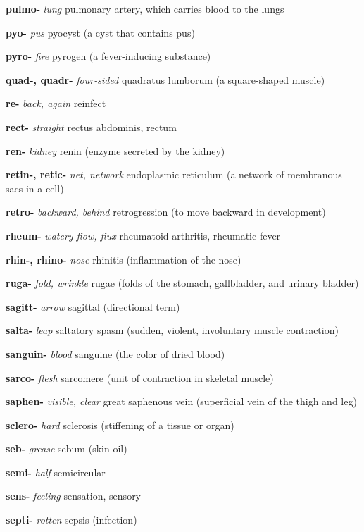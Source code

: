 \documentclass[10pt]{article}
\begin{document}
\begin{multicols}{2}
\begin{hangparas}{10pt}{1}
 \textbf{pulmo-} \textit{lung} pulmonary artery, which carries blood to the lungs \par
 \textbf{pyo-} \textit{pus} pyocyst (a cyst that contains pus) \par
 \textbf{pyro-} \textit{fire} pyrogen (a fever-inducing substance) \par
 \textbf{quad-, quadr-} \textit{four-sided} quadratus lumborum (a square-shaped muscle) \par
 \textbf{re-} \textit{back, again} reinfect \par
 \textbf{rect-} \textit{straight} rectus abdominis, rectum \par
 \textbf{ren-} \textit{kidney} renin (enzyme secreted by the kidney) \par
 \textbf{retin-, retic-} \textit{net, network} endoplasmic reticulum (a network of membranous sacs in a cell) \par
 \textbf{retro-} \textit{backward, behind} retrogression (to move backward in development) \par
 \textbf{rheum-} \textit{watery flow, flux} rheumatoid arthritis, rheumatic fever \par
 \textbf{rhin-, rhino-} \textit{nose} rhinitis (inflammation of the nose) \par
 \textbf{ruga-} \textit{fold, wrinkle} rugae (folds of the stomach, gallbladder, and urinary bladder) \par
 \textbf{sagitt-} \textit{arrow} sagittal (directional term) \par
 \textbf{salta-} \textit{leap} saltatory spasm (sudden, violent, involuntary muscle contraction) \par
 \textbf{sanguin-} \textit{blood} sanguine (the color of dried blood) \par
 \textbf{sarco-} \textit{flesh} sarcomere (unit of contraction in skeletal muscle) \par
 \textbf{saphen-} \textit{visible, clear} great saphenous vein (superficial vein of the thigh and leg) \par
 \textbf{sclero-} \textit{hard} sclerosis (stiffening of a tissue or organ) \par
 \textbf{seb-} \textit{grease} sebum (skin oil) \par
 \textbf{semi-} \textit{half} semicircular \par
 \textbf{sens-} \textit{feeling} sensation, sensory \par
 \textbf{septi-} \textit{rotten} sepsis (infection) \par

\end{hangparas}
\end{multicols}
\end{document}
